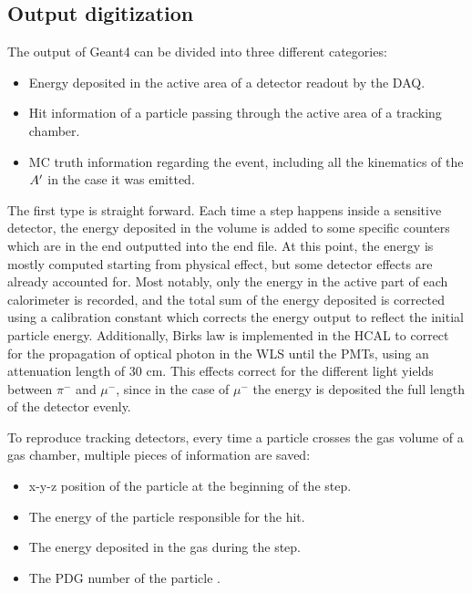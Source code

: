 \subsection{Output digitization}
\label{ch3:sec:geant4-digitization}

The output of Geant4 can be divided into three different categories:

\begin{itemize}
\item Energy deposited in the active area of a detector readout by the DAQ.
\item Hit information of a particle passing through the active area of a tracking chamber.
\item MC truth information regarding the event, including all the kinematics of the $A'$ in the case it was emitted.
\end{itemize}

The first type is straight forward. Each time a step happens inside a sensitive detector, the energy deposited in the volume is added to some specific counters which are in the end outputted into the end file. At this point, the energy is mostly computed starting from physical effect, but some detector effects are already accounted for. Most notably, only the energy in the active part of each calorimeter is recorded, and the total sum of the energy deposited is corrected using a calibration constant which corrects the energy output to reflect the initial particle energy. Additionally, Birks law \cite{NYIBULE2014141} is implemented in the HCAL to correct for the propagation of optical photon in the WLS until the PMTs, using an attenuation length of 30 \si{\centi\meter}. This effects correct for the different light yields between $\pi^-$ and $\mu^-$, since in the case of $\mu^-$ the energy is deposited the full length of the detector evenly.

To reproduce tracking detectors, every time a particle crosses the gas volume of a gas chamber, multiple pieces of information are saved:

\begin{itemize}
\item x-y-z position of the particle at the beginning of the step.
\item The energy of the particle responsible for the hit.  
\item The energy deposited in the gas during the step.
\item The PDG number of the particle \cite{particle-numbering-scheme}.
\end{itemize}

